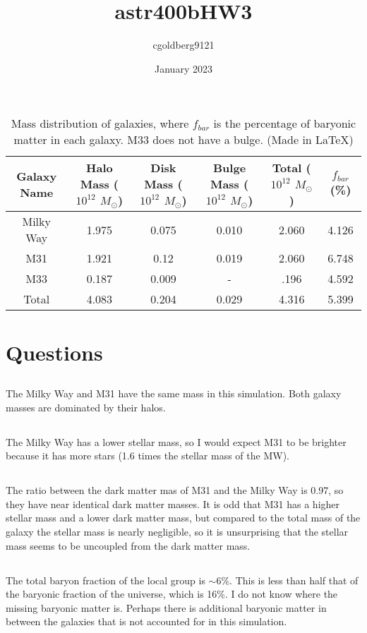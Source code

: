 \documentclass{article}
\title{astr400bHW3}
\author{cgoldberg9121 }
\date{January 2023}
\begin{document}
\begin{table}
    \centering
    \hspace*{-4.4cm}
    \begin{tabular}{|c|c|c|c|c|c|}
        \hline
         \textbf{Galaxy Name} & \textbf{Halo Mass ($10^{12}$ $M_{\odot}$)}& \textbf{Disk Mass ($10^{12}$ $M_{\odot}$)} & \textbf{Bulge Mass ($10^{12}$ $M_{\odot}$)} & \textbf{Total ($10^{12}$ $M_{\odot}$)} & \textbf{$f_{bar}$ (\%)}  \\ \hline
         Milky Way & 1.975 & 0.075 & 0.010 & 2.060 & 4.126\\
         M31 & 1.921 & 0.12 & 0.019 & 2.060 & 6.748\\
         M33 & 0.187 & 0.009 & -& .196 & 4.592\\
         Total & 4.083 & 0.204 & 0.029 & 4.316 & 5.399\\
         \hline
    \end{tabular}
    \caption{Mass distribution of galaxies, where $f_{bar}$ is the percentage of baryonic matter in each galaxy. M33 does not have a bulge. (Made in LaTeX)}
    \label{tab:my_label}
\end{table}

\section{Questions}

\subsection{}

The Milky Way and M31 have the same mass in this simulation. Both galaxy masses are dominated by their halos.

\subsection{}

The Milky Way has a lower stellar mass, so I would expect M31 to be brighter because it has more stars (1.6 times the stellar mass of the MW).

\subsection{}

The ratio between the dark matter mas of M31 and the Milky Way is 0.97, so they have near identical dark matter masses. It is odd that M31 has a higher stellar mass and a lower dark matter mass, but compared to the total mass of the galaxy the stellar mass is nearly negligible, so it is unsurprising that the stellar mass seems to be uncoupled from the dark matter mass.

\subsection{}

The total baryon fraction of the local group is $\sim6$\%. This is less than half that of the baryonic fraction of the universe, which is 16\%. I do not know where the missing baryonic matter is. Perhaps there is additional baryonic matter in between the galaxies that is not accounted for in this simulation.
\end{document}
